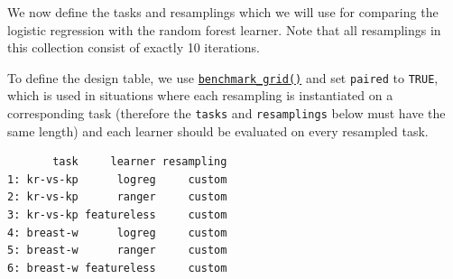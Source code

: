 \begin{Shaded}
\begin{Highlighting}[]
\OtherTok{=} \NormalTok{(}
   \NormalTok{,}
  \SpecialCharTok{$}
   
\NormalTok{)}
\end{Highlighting}
\end{Shaded}

We now define the tasks and resamplings which we will use for comparing
the logistic regression with the random forest learner. Note that all
resamplings in this collection consist of exactly 10 iterations.

\begin{Shaded}
\begin{Highlighting}[]
\OtherTok{=} \SpecialCharTok{$}

\OtherTok{=} 
\OtherTok{=} 
\end{Highlighting}
\end{Shaded}

To define the design table, we use
\href{https://mlr3.mlr-org.com/reference/benchmark_grid.html}{\texttt{benchmark\_grid()}}
and set \texttt{paired} to \texttt{TRUE}, which is used in situations
where each resampling is instantiated on a corresponding task (therefore
the \texttt{tasks} and \texttt{resamplings} below must have the same
length) and each learner should be evaluated on every resampled task.

\begin{Shaded}
\begin{Highlighting}[]
\OtherTok{=} 
   \NormalTok{)}
\NormalTok{large\_design[}\SpecialCharTok{:}\NormalTok{] }
\end{Highlighting}
\end{Shaded}

\begin{verbatim}
       task     learner resampling
1: kr-vs-kp      logreg     custom
2: kr-vs-kp      ranger     custom
3: kr-vs-kp featureless     custom
4: breast-w      logreg     custom
5: breast-w      ranger     custom
6: breast-w featureless     custom
\end{verbatim}

